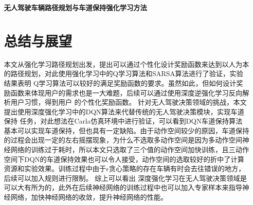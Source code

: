 \documentclass[zihao=-4,a4paper]{ctexart}
\begin{document}
	\newpage
	\thispagestyle{plain}
	\renewcommand\contentsname{\centerline{\zihao{3}    目\hspace*{2em}录}}

	\tableofcontents
	\thispagestyle{plain} %
% 
	
	\newpage
	
	\thispagestyle{fancy}
	\vspace*{-20pt}
	\begin{center}
	 \bfseries  无人驾驶车辆路径规划与车道保持强化学习方法
	\vspace*{20pt}
	\end{center}
	
	
 \sectionend
 \sectionend
 \sectionend
 \sectionend


	
	\vspace*{0pt}
	\section*{总结与展望}	
	
	
  
  本文从强化学习路径规划出发，提出可以通过个性化设计奖励函数来达到以人为本的路径规划，对此使用强化学习中的Q学习算法和SARSA算法进行了验证，实验结果表明
Q学习算法可以较好的满足奖励函数的要求。虽然如此，但如何设计奖励函数来体现用户的需求也是一大难题，后续可以通过使用深度逆强化学习反向解析用户习惯，得到用户
的个性化奖励函数。
针对无人驾驶决策领域的挑战，本文提出使用深度强化学习中的DQN算法来代替传统的无人驾驶决策模块，实现车道保持
任务，对此想法在Carla仿真环境中进行验证，可以看到DQN车道保持算法基本可以实现车道保持，但也具有一定缺陷。由于动作空间较少的原因，车道保持的过程会出现一定的左右摇摆现象，为什么不选取多动作空间是因为多动作空间神经网络的训练过于耗时，所以本文只选取了三个值的动作空间加快训练，且三动作空间下DQN的车道保持效果也可以令人接受，动作空间的选取较好的折中了计算资源和实验效果。训练过程中由于$\epsilon$贪心策略的存在车辆有时会去往错误的地方，后续可以加入规则进行限制。
综上可以看出
深度强化学习在无人驾驶决策领域是可以大有所为的，此外在后续神经网络的训练过程中也可以加入专家样本来指导神经网络，加快神经网络的收敛，提升神经网络的性能。
   
\end{document}
